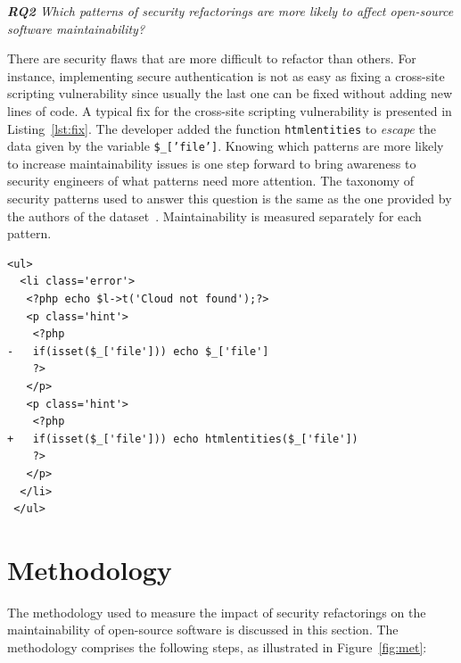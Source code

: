 \documentclass[sigconf,review]{acmart}
\newcounter{lstannotation}
\begin{document}
\begin{framed}
\textit{\textbf{RQ2} Which patterns of security refactorings are more likely to
affect open-source software maintainability?}
\end{framed}
\vspace{-0.1cm}
There are security flaws that are more difficult to refactor than others. For
instance, implementing secure authentication is not as easy as fixing a
cross-site scripting vulnerability since usually the last one can be fixed
without adding new lines of code. A typical fix for the cross-site scripting
vulnerability is presented in Listing~\ref{lst:fix}. The developer added the
function \texttt{htmlentities} to \textit{escape} the data given by the variable
\texttt{\$\_['file']}. Knowing which patterns are more likely to increase
maintainability issues is one step forward to bring awareness to security
engineers of what patterns need more attention. The taxonomy of security
patterns used to answer this question is the same as the one provided by the
authors of the dataset~\cite{Reis:2017:IJSSE}. Maintainability is measured
separately for each pattern.\\

\setcounter{lstannotation}{0}
\begin{lstlisting}[style={PHPStyle}, caption={Fix provided by \texttt{nextcloud/server} developers to a \\Cross-Site Scripting vulnerability},label={lst:fix}]
 <ul>
  <li class='error'>
   <?php echo $l->t('Cloud not found');?>
   <p class='hint'>
    <?php
-   if(isset($_['file'])) echo $_['file']
    ?>
   </p>
   <p class='hint'>
    <?php
+   if(isset($_['file'])) echo htmlentities($_['file'])
    ?>
   </p>
  </li>
 </ul>

\end{lstlisting}

\section{Methodology}\label{sec:methodology}
%
The methodology used to measure the impact of security refactorings on the
maintainability of open-source software is discussed in this section.
The methodology comprises the following steps, as illustrated in
Figure~\ref{fig:met}:
\end{document}
